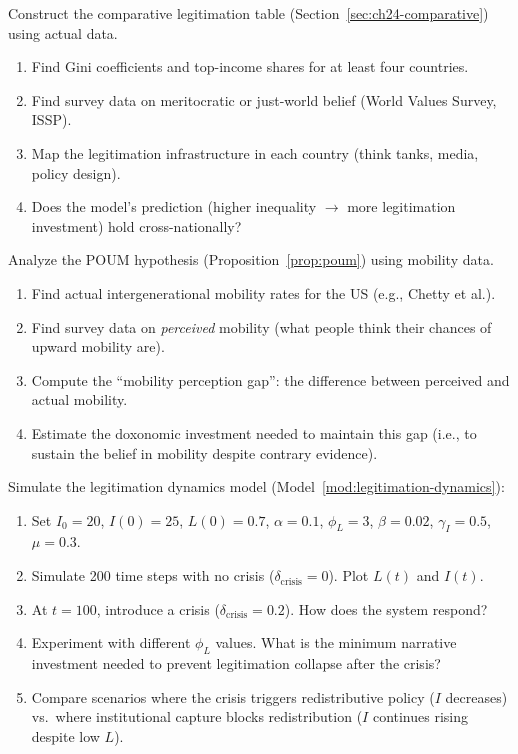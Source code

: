 \begin{exercise}
Construct the comparative legitimation table (Section~\ref{sec:ch24-comparative}) using actual data.
\begin{enumerate}[nosep]
  \item Find Gini coefficients and top-income shares for at least four countries.
  \item Find survey data on meritocratic or just-world belief (World Values Survey, ISSP).
  \item Map the legitimation infrastructure in each country (think tanks, media, policy design).
  \item Does the model's prediction (higher inequality $\to$ more legitimation investment) hold cross-nationally?
\end{enumerate}
\end{exercise}

\begin{exercise}
Analyze the POUM hypothesis (Proposition~\ref{prop:poum}) using mobility data.
\begin{enumerate}[nosep]
  \item Find actual intergenerational mobility rates for the US (e.g., Chetty et al.).
  \item Find survey data on \emph{perceived} mobility (what people think their chances of upward mobility are).
  \item Compute the ``mobility perception gap'': the difference between perceived and actual mobility.
  \item Estimate the doxonomic investment needed to maintain this gap (i.e., to sustain the belief in mobility despite contrary evidence).
\end{enumerate}
\end{exercise}

\begin{exercise}[Computational]
Simulate the legitimation dynamics model (Model~\ref{mod:legitimation-dynamics}):
\begin{enumerate}[nosep]
  \item Set $I_0 = 20$, $I(0) = 25$, $L(0) = 0.7$, $\alpha = 0.1$, $\phi_L = 3$, $\beta = 0.02$, $\gamma_I = 0.5$, $\mu = 0.3$.
  \item Simulate 200 time steps with no crisis ($\delta_{\text{crisis}} = 0$). Plot $L(t)$ and $I(t)$.
  \item At $t = 100$, introduce a crisis ($\delta_{\text{crisis}} = 0.2$). How does the system respond?
  \item Experiment with different $\phi_L$ values. What is the minimum narrative investment needed to prevent legitimation collapse after the crisis?
  \item Compare scenarios where the crisis triggers redistributive policy ($I$ decreases) vs.\ where institutional capture blocks redistribution ($I$ continues rising despite low $L$).
\end{enumerate}
\end{exercise}
